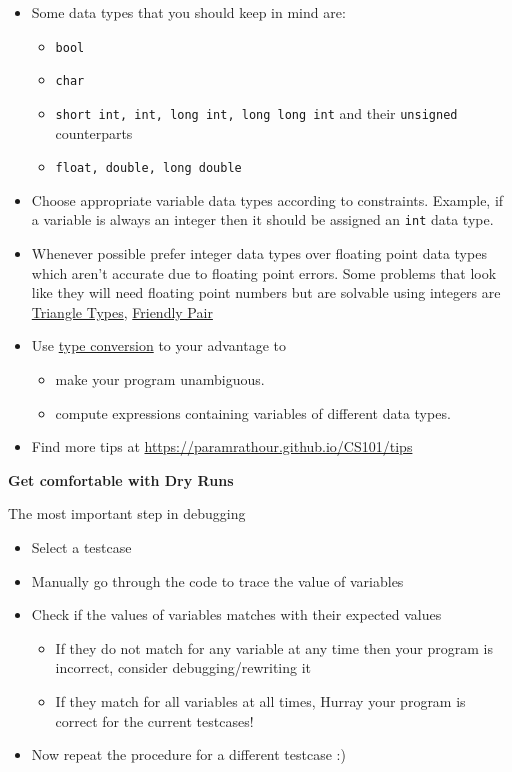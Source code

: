 \begin{itemize}
\item Some data types that you should keep in mind are:
	\begin{itemize}
	\item \verb!bool!
	\item \verb!char!
	\item \verb!short int, int, long int, long long int! and their \verb!unsigned! counterparts
	\item \verb!float, double, long double!
	\end{itemize}
\item Choose appropriate variable data types according to constraints. Example, if a variable is always an integer then it should be assigned an \verb!int! data type.
\item Whenever possible prefer integer data types over floating point data types which aren't accurate due to floating point errors. Some problems that look like they will need floating point numbers but are solvable using integers are \hyperref[pp:triangletypes]{Triangle Types}, \hyperref[pp:friendlypair]{Friendly Pair}
\item Use \href{https://www.geeksforgeeks.org/type-conversion-in-c/}{type conversion} to your advantage to
	\begin{itemize}
	\item make your program unambiguous.
	\item compute expressions containing variables of different data types.
	\end{itemize}
\item Find more tips at \url{https://paramrathour.github.io/CS101/tips}
\end{itemize}
\begin{center}
	\textbf{\large{Get comfortable with Dry Runs}}
\end{center}
The most important step in debugging
\begin{itemize}	
\item Select a testcase
\item Manually go through the code to trace the value of variables
\item Check if the values of variables matches with their expected values
\begin{itemize}
	\item If they do not match for any variable at any time then your program is incorrect, consider debugging/rewriting it
	\item If they match for all variables at all times, Hurray your program is correct for the current testcases!
\end{itemize}
\item Now repeat the procedure for a different testcase :)
\end{itemize}
